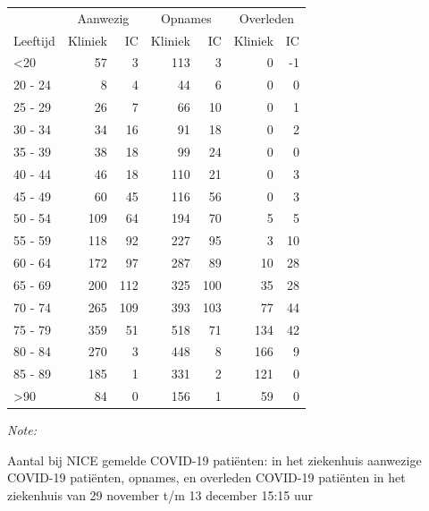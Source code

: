 \documentclass[
  english,
  man,floatsintext]{apa6}
\begin{document}
\begin{table}
\centering\begingroup\fontsize{10}{12}\selectfont

\begin{threeparttable}
\begin{tabular}{lrrrrrr}
\toprule
\multicolumn{1}{c}{ } & \multicolumn{2}{c}{Aanwezig} & \multicolumn{2}{c}{Opnames} & \multicolumn{2}{c}{Overleden} \\
\cmidrule(l{3pt}r{3pt}){2-3} \cmidrule(l{3pt}r{3pt}){4-5} \cmidrule(l{3pt}r{3pt}){6-7}
Leeftijd & Kliniek & IC & Kliniek & IC & Kliniek & IC\\
\midrule
<20 & 57 & 3 & 113 & 3 & 0 & -1\\
20 - 24 & 8 & 4 & 44 & 6 & 0 & 0\\
25 - 29 & 26 & 7 & 66 & 10 & 0 & 1\\
30 - 34 & 34 & 16 & 91 & 18 & 0 & 2\\
35 - 39 & 38 & 18 & 99 & 24 & 0 & 0\\
40 - 44 & 46 & 18 & 110 & 21 & 0 & 3\\
45 - 49 & 60 & 45 & 116 & 56 & 0 & 3\\
50 - 54 & 109 & 64 & 194 & 70 & 5 & 5\\
55 - 59 & 118 & 92 & 227 & 95 & 3 & 10\\
60 - 64 & 172 & 97 & 287 & 89 & 10 & 28\\
65 - 69 & 200 & 112 & 325 & 100 & 35 & 28\\
70 - 74 & 265 & 109 & 393 & 103 & 77 & 44\\
75 - 79 & 359 & 51 & 518 & 71 & 134 & 42\\
80 - 84 & 270 & 3 & 448 & 8 & 166 & 9\\
85 - 89 & 185 & 1 & 331 & 2 & 121 & 0\\
>90 & 84 & 0 & 156 & 1 & 59 & 0\\
\bottomrule
\end{tabular}
\begin{tablenotes}
\item \textit{Note: } 
\item Aantal bij NICE gemelde COVID-19 patiënten: in het ziekenhuis aanwezige COVID-19 patiënten, opnames, en overleden COVID-19 patiënten in het ziekenhuis van 29 november t/m 13 december 15:15 uur
\end{tablenotes}
\end{threeparttable}
\endgroup{}
\end{table}

\newpage
\end{document}
